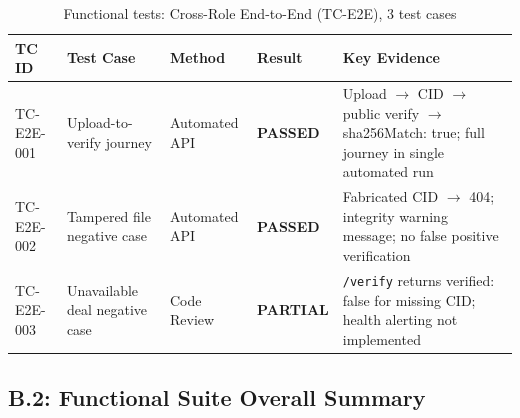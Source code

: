 \begin{table}[H]
  \centering
  \smalltable
  \footnotesize
  {%
  \setlength{\tabcolsep}{4pt}
  \renewcommand{\arraystretch}{1.3}
  \begin{tabular}{|>{\raggedright\arraybackslash}p{}|
                  >{\raggedright\arraybackslash}p{}|
                  >{\raggedright\arraybackslash}p{}|
                  >{\centering\arraybackslash}p{}|
                  >{\raggedright\arraybackslash}p{}|}
    \hline
    \textbf{TC ID} & \textbf{Test Case} & \textbf{Method} & \textbf{Result} & \textbf{Key Evidence} \\
    \hline\hline
    TC-E2E-001 & Upload-to-verify journey & Automated API & \textbf{PASSED} & Upload $\rightarrow$ CID $\rightarrow$ public verify $\rightarrow$ sha256Match: true; full journey in single automated run \\
    \hline
    TC-E2E-002 & Tampered file negative case & Automated API & \textbf{PASSED} & Fabricated CID $\rightarrow$ 404; integrity warning message; no false positive verification \\
    \hline
    TC-E2E-003 & Unavailable deal negative case & Code Review & \textbf{PARTIAL} & \texttt{/verify} returns verified: false for missing CID; health alerting not implemented \\
    \hline
  \end{tabular}
  }%
  \captionsetup{type=table}
  \caption{Functional tests: Cross-Role End-to-End (TC-E2E), 3 test cases}
  \label{tab:func-e2e}
\end{table}

\subsection*{B.2: Functional Suite Overall Summary}

